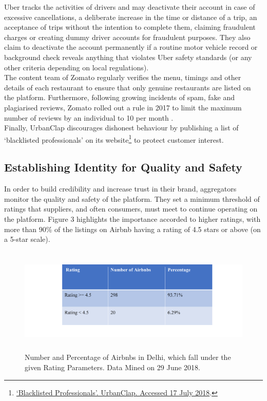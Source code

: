\documentclass[a4paper, 12pt, twoside]{article}
\begin{document}
                  Uber tracks the activities of drivers and may deactivate their account in case of excessive cancellations, a deliberate increase in the time or distance of a trip, an acceptance of trips without the intention to complete them, claiming fraudulent charges or creating dummy driver accounts for fraudulent purposes. They also claim to deactivate the account permanently if a routine motor vehicle record or background check reveals anything that violates Uber safety standards (or any other criteria depending on local regulations). \\

The content team of Zomato regularly verifies the menu, timings and other details of each restaurant to ensure that only genuine restaurants are listed on the platform. Furthermore, following growing incidents of spam, fake and plagiarised reviews, Zomato rolled out a rule in 2017 to limit the maximum number of reviews by an individual to 10 per month \parencite{Narang17}. \\

Finally, UrbanClap discourages dishonest behaviour by publishing a list of ‘blacklisted professionals’ on its website\footnote{\href{ https://bit.ly/2OI73vv}{‘Blacklisted Professionals’. UrbanClap. Accessed 17 July 2018}.} to protect customer interest. 
               


     
                    \subsection{Establishing Identity for Quality and Safety }
                    
                    In order to build credibility and increase trust in their brand, aggregators monitor the quality and safety of the platform. They set a minimum threshold of ratings that suppliers, and often consumers, must meet to continue operating on the platform. Figure 3 highlights the importance accorded to higher ratings, with more than 90\% of the listings on Airbnb having a rating of 4.5 stars or above (on a 5-star scale). \\

\begin{figure}[h!]
\centering
\vspace{20pt}%
\includegraphics[height=2in]{figure2.png}
\captionsetup{justification=centering}\caption{Number and Percentage of Airbnbs in Delhi, which fall under the given Rating Parameters. Data Mined on 29 June 2018.}
\end{figure}
\end{document}
